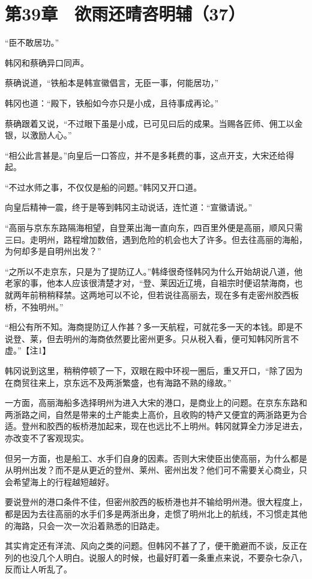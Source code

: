 \section{第39章　欲雨还晴咨明辅（37）}

“臣不敢居功。”

韩冈和蔡确异口同声。

蔡确说道，“铁船本是韩宣徽倡言，无臣一事，何能居功，”

韩冈也道：“殿下，铁船如今亦只是小成，且待事成再论。”

蔡确跟着又说，“不过眼下虽是小成，已可见曰后的成果。当赐各匠师、佣工以金银，以激励人心。”

“相公此言甚是。”向皇后一口答应，并不是多耗费的事，这点开支，大宋还给得起。

“不过水师之事，不仅仅是船的问题。”韩冈又开口道。

向皇后精神一震，终于是等到韩冈主动说话，连忙道：“宣徽请说。”

“高丽与京东东路隔海相望，自登莱出海一直向东，四百里外便是高丽，顺风只需三曰。走明州，路程增加数倍，遇到危险的机会也大了许多。但去往高丽的海船，为何却多是自明州出发？”

“之所以不走京东，只是为了提防辽人。”韩绛很奇怪韩冈为什么开始胡说八道，他老家的事，他本人应该很清楚才对，“登、莱因近辽境，自祖宗时便诏禁海商，也就两年前稍稍释禁。这两地可以不论，但若说往高丽去，现在多有走密州胶西板桥，不独明州。”

“相公有所不知。海商提防辽人作甚？多一天航程，可就花多一天的本钱。即是不说登、莱，但去明州的海商依然要比密州更多。只从税入看，便可知韩冈所言不虚。”【注1】

韩冈说到这里，稍稍停顿了一下，双眼在殿中环视一圈后，重又开口，“除了因为在商贸往来上，京东远不及两浙繁盛，也有海路不熟的缘故。”

一方面，高丽海船多选择明州为进入大宋的港口，是商业上的问题。在京东东路和两浙路之间，自然是带来的土产能卖上高价，且收购的特产又便宜的两浙路更为合适。登州和胶西的板桥港加起来，现在也远比不上明州。韩冈就算全力涉足进去，亦改变不了客观现实。

但另一方面，也是船工、水手们自身的因素。否则大宋使臣出使高丽，为什么都是从明州出发？而不是从更近的登州、莱州、密州出发？他们可不需要关心商业，只会希望海上的行程越短越好。

要说登州的港口条件不佳，但密州胶西的板桥港也并不输给明州港。很大程度上，都是因为去往高丽的水手们多是两浙出身，走惯了明州北上的航线，不习惯走其他的海路，只会一次一次沿着熟悉的旧路走。

其实肯定还有洋流、风向之类的问题。但韩冈不甚了了，便干脆避而不谈，反正在列的也没几个人明白。说服人的时候，也最好盯着一条重点来说，不要杂七杂八，反而让人听乱了。

